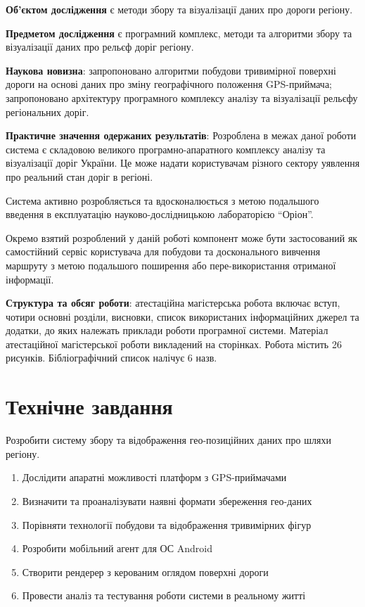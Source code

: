 \documentclass[simple,a4paper,14pt,ukrainian,utf8]{eskdtext}
\begin{document}
	\textbf{Об’єктом дослідження} є методи збору та візуалізації даних про дороги регіону.

	\textbf{Предметом дослідження} є програмний комплекс, методи та алгоритми збору та візуалізації даних про рельєф доріг регіону.

	\textbf{Наукова новизна}: запропоновано алгоритми побудови тривимірної поверхні дороги на основі даних про зміну географічного положення GPS-приймача; запропоновано архітектуру програмного комплексу аналізу та візуалізації рельєфу регіональних доріг.

	\textbf{Практичне значення одержаних результатів}: Розроблена в межах даної роботи система є складовою великого програмно-апаратного комплексу аналізу та візуалізації доріг України. Це може надати користувачам різного сектору уявлення про реальний стан доріг в регіоні.
	
	Система активно розробляється та вдосконалюється з метою подальшого введення в експлуатацію науково-дослідницькою лабораторією “Оріон”. 

	Окремо взятий розроблений у даній роботі компонент може бути застосований як самостійний сервіс користувача для побудови та досконального вивчення маршруту з метою подальшого поширення або пере-використання отриманої інформації.

	\textbf{Структура та обсяг роботи}: атестаційна магістерська робота включає вступ, чотири основні розділи, висновки, список використаних інформаційних джерел та додатки, до яких належать приклади роботи програмної системи. Матеріал атестаційної магістерської роботи викладений на \pageref{LastPage} сторінках. Робота містить 26 рисунків. Бібліографічний список налічує 6 назв.

\clearpage \newpage \section{Технічне завдання}

    Розробити систему збору та відображення гео-позиційних даних про шляхи регіону.

    \begin{enumerate}
        \item Дослідити апаратні можливості платформ з GPS-приймачами
        \item Визначити та проаналізувати наявні формати збереження гео-даних
        \item Порівняти технології побудови та відображення тривимірних фігур
        \item Розробити мобільний агент для ОС Android
        \item Створити рендерер з керованим оглядом поверхні дороги
        \item Провести аналіз та тестування роботи системи в реальному житті
    \end{enumerate}
\end{document}
